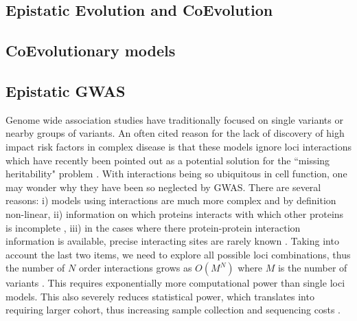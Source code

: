 
\subsection{Epistatic Evolution and CoEvolution}

\subsection{CoEvolutionary models}


\subsection{Epistatic GWAS \label{sec:epigwas}}

Genome wide association studies have traditionally focused on single variants or nearby groups of variants. An often cited reason for the lack of discovery of high impact risk factors in complex disease is that these models ignore loci interactions \cite{cordell2009detecting} which have recently been pointed out as a potential solution for the ``missing heritability" problem \cite{zuk2012mystery, zuk2014searching}. With interactions being so ubiquitous in cell function, one may wonder why they have been so neglected by GWAS. There are several reasons: i) models using interactions are much more complex \cite{gao2010classification} and by definition non-linear, ii) information on which proteins interacts with which other proteins is incomplete \cite{venkatesan2009empirical}, iii) in the cases where there protein-protein interaction information is available, precise interacting sites are rarely known \cite{venkatesan2009empirical}. Taking into account the last two items, we need to explore all possible loci combinations, thus the number of $N$ order interactions grows as $O(M^N)$ where $M$ is the number of variants \cite{de2013emerging}. This requires exponentially more computational power than single loci models. This also severely reduces statistical power, which translates into requiring larger cohort, thus increasing sample collection and sequencing costs \cite{de2013emerging}.

